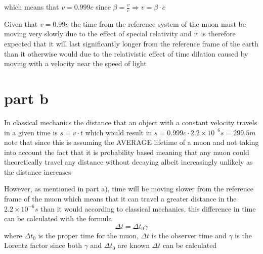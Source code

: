 \documentclass[12pt,a4paper]{article}
\begin{document}
which means that \begin{math}
v=0.999c
\end{math} since \begin{math}
\beta=\frac{v}{c}\Rightarrow v=\beta \cdot c
\end{math}

\vspace{2 mm}
Given that \begin{math}
v=0.99c
\end{math}
the time from the reference system of the muon must be moving very slowly due to the effect of special relativity and it is therefore expected that it will last significantly longer from the reference frame of the earth than it otherwise would due to the relativistic effect of time dilation caused by moving with a velocity near the speed of light

\section{part b}

In classical mechanics the distance that an object with a constant velocity travels in a given time is
\begin{math}
s=v\cdot t
\end{math}
which would result in
\begin{math}
s=0.999c\cdot2.2\times10^{^-6}\si{s}=299.5\si{m}
\end{math}
note that since this is assuming the AVERAGE lifetime of a muon and not taking into account the fact that it is probability based meaning that any muon could theoretically travel any distance without decaying albeit increasingly unlikely as the distance increases

However, as mentioned in part a), time will be moving slower from the reference frame of the muon which means that it can travel a greater distance in the \begin{math}
2.2\times10^{-6}\si{s}
\end{math} than it would according to classical mechanics. 
this difference in time can be calculated with the formula 
\begin{equation} \label{}
\Delta t=\Delta t_0\gamma
\end{equation}
where \begin{math}
\Delta t_0
\end{math} is the proper time for the muon, \begin{math}
\Delta t
\end{math} is the observer time and \begin{math}
\gamma
\end{math} is the Lorentz factor
since both \begin{math}
\gamma
\end{math} and \begin{math}
\Delta t_0
\end{math}
are known \begin{math}
\Delta t
\end{math} can be calculated
\end{document}
